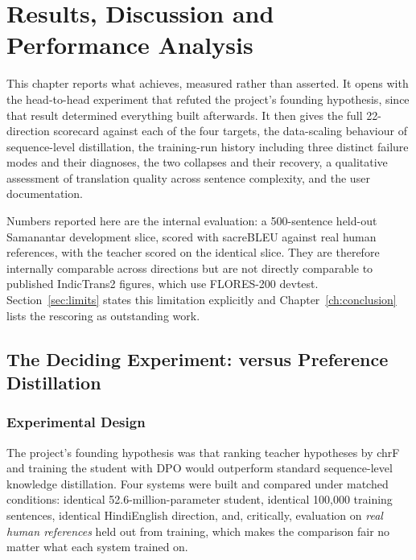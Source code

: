 \chapter{Results, Discussion and Performance Analysis}
\label{ch:results}

This chapter reports what \setu{} achieves, measured rather than asserted. It
opens with the head-to-head experiment that refuted the project's founding
hypothesis, since that result determined everything built afterwards. It then
gives the full 22-direction scorecard against each of the four targets, the
data-scaling behaviour of sequence-level distillation, the training-run history
including three distinct failure modes and their diagnoses, the two collapses
and their recovery, a qualitative assessment of translation quality across
sentence complexity, and the user documentation.

Numbers reported here are the internal evaluation: a 500-sentence held-out
Samanantar development slice, scored with sacreBLEU against real human
references, with the teacher scored on the identical slice. They are therefore
internally comparable across directions but are not directly comparable to
published IndicTrans2 figures, which use FLORES-200 devtest. Section~\ref{sec:limits}
states this limitation explicitly and Chapter~\ref{ch:conclusion} lists the
rescoring as outstanding work.

\section{The Deciding Experiment: \seqkd{} versus Preference Distillation}
\label{sec:headtohead}

\subsection{Experimental Design}
\label{subsec:h2hdesign}

The project's founding hypothesis was that ranking teacher hypotheses by chrF
and training the student with DPO would outperform standard sequence-level
knowledge distillation. Four systems were built and compared under matched
conditions: identical 52.6-million-parameter student, identical 100{,}000
training sentences, identical Hindi\arrowto{}English direction, and,
critically, evaluation on \emph{real human references} held out from
training, which makes the comparison fair no matter what each system trained on.

